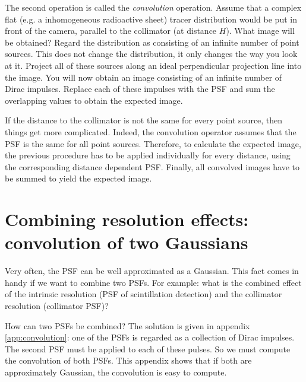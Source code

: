 The second operation is called the {\em convolution} operation. Assume that a
complex flat (e.g. a inhomogeneous radioactive sheet) tracer distribution
would be put in front of the camera, parallel to the collimator (at distance
$H$). What image will be obtained?  Regard the distribution as consisting of
an infinite number of point sources. This does not change the distribution, it
only changes the way you look at it. Project all of these sources along an
ideal perpendicular projection line into the image. You will now obtain an
image consisting of an infinite number of Dirac impulses. Replace each of
these impulses with the PSF and sum the overlapping values to obtain the
expected image.

If the distance to the collimator is not the same for every point source, then
things get more complicated. Indeed, the convolution operator assumes that the
PSF is the same for all point sources. Therefore, to calculate the expected
image, the previous procedure has to be applied individually for every
distance, using the corresponding distance dependent PSF. Finally, all
convolved images have to be summed to yield the expected image.

\newpage
\section{Combining resolution effects: convolution of two Gaussians} \label{app:convol2gauss}
Very often, the PSF can be well approximated as a Gaussian. This fact comes in
handy if we want to combine two PSFs. For example: what is the combined effect
of the intrinsic resolution (PSF of scintillation detection) and the collimator
resolution (collimator PSF)?

How can two PSFs be combined? The solution is given in appendix
\ref{app:convolution}: one of the PSFs is regarded as a collection of Dirac
impulses. The second PSF must be applied to each of these pulses. So we must
compute the convolution of both PSFs. This appendix shows that if both are
approximately Gaussian, the convolution is easy to compute.

